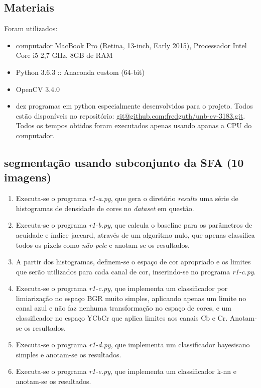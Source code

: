 \documentclass[conference]{IEEEtran}
\begin{document}
\subsection{Materiais}
Foram utilizados:
\begin{itemize}
\item computador MacBook Pro (Retina, 13-inch, Early 2015), Processador Intel Core i5 2,7 GHz, 8GB de RAM
\item Python 3.6.3 :: Anaconda custom (64-bit)
\item OpenCV 3.4.0
\item dez programas em python especialmente desenvolvidos para o projeto. Todos estão disponíveis no repositório: \url{git@github.com:fredguth/unb-cv-3183.git}\label{repo}. Todos os tempos obtidos foram executados apenas usando apanas a CPU do computador.
\end{itemize}

\subsection{segmentação usando subconjunto da SFA (10 imagens)}
 \begin{enumerate}
  \item Executa-se o programa \textit{r1-a.py}, que gera o diretório \textit{results} uma série de histogramas de densidade de cores no \textit{dataset} em questão.
  \item Executa-se o programa \textit{r1-b.py}, que calcula o baseline para os parâmetros de acuidade e índice jaccard, através de um algoritmo nulo, que apenas classifica todos os pixels como \textit{não-pele} e anotam-se os resultados. 
  \item A partir dos histogramas, definem-se o espaço de cor apropriado e os limites que serão utilizados para cada canal de cor, inserindo-se no  programa \textit{r1-c.py}.
  \item Executa-se o programa \textit{r1-c.py}, que implementa um classificador por limiarização no espaço BGR muito simples, aplicando apenas um limite no canal azul e não faz nenhuma transformação no espaço de cores, e um classificador no espaço YCbCr que aplica limites aos canais Cb e Cr. Anotam-se os resultados.
  \item Executa-se o programa \textit{r1-d.py}, que implementa um classificador bayesisano simples e anotam-se os resultados.
   \item Executa-se o programa \textit{r1-e.py}, que implementa um classificador k-nn e anotam-se os resultados.
\end{enumerate}
\end{document}
